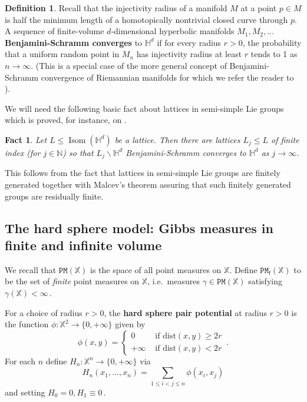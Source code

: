 \documentclass[11pt]{amsart}
\newtheorem{fact}[theorem]{Fact}
\theoremstyle{definition}
\newtheorem{definition}[theorem]{Definition}
\theoremstyle{remark}
\renewcommand{\H}{\mathbb{H}}
\newcommand{\bX}{\mathbb{X}}
\newcommand{\Mf}{\cP_{\mathsf{f}}}
\newcommand{\cP}{\mathtt{PM}}
\newcommand{\Isom}{\operatorname{Isom}}
\newcommand{\dist}{\mathrm{dist}}
\begin{document}
\begin{definition}\label{def:benjamini-schramm}
Recall that the injectivity radius of a manifold $M$ at a point $p\in M$ is half the minimum length of a homotopically nontrivial closed curve through $p$.      A sequence of finite-volume $d$-dimensional hyperbolic manifolds $M_1,M_2,\ldots$ {\bf Benjamini-Schramm converges} to $\H^d$ if for every radius $r>0$, the probability that a uniform random point in $M_n$ has injectivity radius at least $r$ tends to 1 as $n\to\infty$. (This is a special case of the more general concept of Benjamini-Schramm convergence of Riemannian manifolds for which we refer the reader to \cite{MR4520306}). 
\end{definition}

We will need the following basic fact about lattices in semi-simple Lie groups which is proved, for instance, on \cite[pg. 738]{abert2017on}.

\begin{fact}\label{fact:residually-finite}
    Let $L \leq \Isom(\H^d)$ be a lattice.  Then there are lattices $L_j \leq L$ of finite index (for  $j\in \mathbb{N}$) so that $L_j \backslash \H^d$ Benjamini-Schramm converges to $\H^d$ as $j\to\infty$.
\end{fact}

This follows from the fact that lattices in semi-simple Lie groups are finitely generated together with Malcev's theorem assuring that such finitely generated groups are residually finite. 



\subsection{The hard sphere model: Gibbs measures in finite and infinite volume} \label{sec:Gibbs-definitions}

We recall that $\cP(\bX)$ is the space of all point measures on $\bX$.  Define $\Mf(\bX)$ to be the set of \emph{finite} point measures on $\bX$, i.e.\ measures $\gamma \in \cP(\bX)$ satisfying $\gamma(\bX) < \infty\,.$  




For a choice of radius $r > 0$, the \textbf{hard sphere pair potential} at radius $r > 0$ is the function $\phi:\bX^2 \to \{0,+\infty\}$ given by 
\begin{equation*}
\phi(x,y) = \begin{cases}0 & \text{ if } \dist(x,y) \geq 2r \\
+\infty &\text{ if } \dist(x,y) < 2r\end{cases}\,.
\end{equation*}
%
For each $n$ define $H_n : \bX^n \to \{0,+\infty\}$ via \begin{equation*}
    H_n(x_1,\ldots,x_n) = \sum_{1 \leq i < j \leq n} \phi(x_i,x_j)
\end{equation*}
and setting $H_0 = 0, H_1 \equiv 0\,.$  
\end{document}
